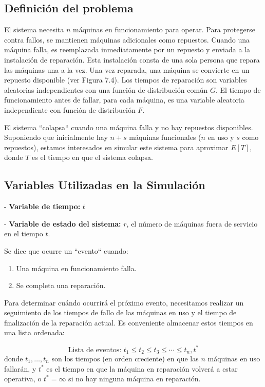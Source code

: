 \documentclass[a4paper, 12pt]{article}
\begin{document}
\subsection{Definición del problema}
El sistema necesita $ n $ máquinas en funcionamiento para operar. Para protegerse contra fallos, se mantienen máquinas adicionales como repuestos. Cuando una máquina falla, es reemplazada inmediatamente por un repuesto y enviada a la instalación de reparación. Esta instalación consta de una sola persona que repara las máquinas una a la vez. Una vez reparada, una máquina se convierte en un repuesto disponible (ver Figura 7.4). Los tiempos de reparación son variables aleatorias independientes con una función de distribución común $ G $. El tiempo de funcionamiento antes de fallar, para cada máquina, es una variable aleatoria independiente con función de distribución $ F $.

El sistema ``colapsa`` cuando una máquina falla y no hay repuestos disponibles. Suponiendo que inicialmente hay $ n + s $ máquinas funcionales ($ n $ en uso y $ s $ como repuestos), estamos interesados en simular este sistema para aproximar $ E[T] $, donde $ T $ es el tiempo en que el sistema colapsa.

\subsection*{Variables Utilizadas en la Simulación}

    
- \textbf{Variable de tiempo:} $ t $
    
- \textbf{Variable de estado del sistema:} $ r $, el número de máquinas fuera de servicio en el tiempo $ t $.


Se dice que ocurre un ``evento`` cuando:
\begin{enumerate}
    \item Una máquina en funcionamiento falla.
    \item Se completa una reparación.
\end{enumerate}

Para determinar cuándo ocurrirá el próximo evento, necesitamos realizar un seguimiento de los tiempos de fallo de las máquinas en uso y el tiempo de finalización de la reparación actual. Es conveniente almacenar estos tiempos en una lista ordenada:

\[
\text{Lista de eventos: } t_1 \leq t_2 \leq t_3 \leq \cdots \leq t_n, t^*
\]
donde $ t_1, \dots, t_n $ son los tiempos (en orden creciente) en que las $ n $ máquinas en uso fallarán, y $ t^* $ es el tiempo en que la máquina en reparación volverá a estar operativa, o $ t^* = \infty $ si no hay ninguna máquina en reparación.
\end{document}
